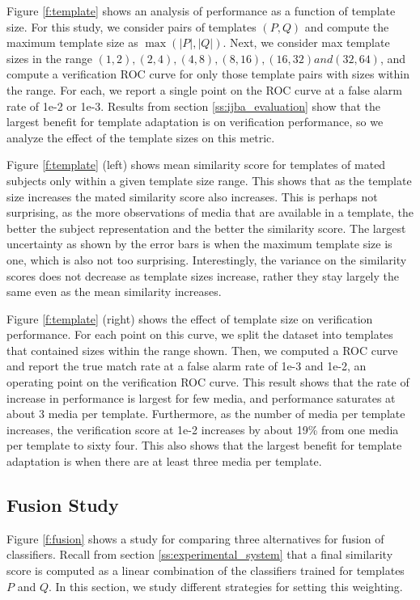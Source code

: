 \documentclass[10pt,twocolumn,letterpaper]{article}
\theoremstyle{definition}		\newtheorem{defn}[thm]{Definition}
\begin{document}
Figure \ref{f:template} shows an analysis of performance as a function of template size.  For this study, we consider pairs of templates $(P,Q)$ and compute the maximum template size as $\max(|P|,|Q|)$.   Next, we consider max template sizes in the range $(1,2), (2,4), (4,8), (8,16), (16,32) and (32,64)$, and compute a verification ROC curve for only those template pairs with sizes within the range. For each, we report a single point on the ROC curve at a false alarm rate of 1e-2 or 1e-3.  Results from section \ref{ss:ijba_evaluation} show that the largest benefit for template adaptation is on verification performance, so we analyze the effect of the template sizes on this metric.   

Figure \ref{f:template} (left) shows mean similarity score for templates of mated subjects only within a given template size range.  This shows that as the template size increases the mated similarity score also increases.  This is perhaps not surprising, as the more observations of media that are available in a template, the better the subject representation and the better the similarity score.  The largest uncertainty as shown by the error bars is when the maximum template size is one, which is also not too surprising.  Interestingly, the variance on the similarity scores does not decrease as template sizes increase, rather they stay largely the same even as the mean similarity increases.

Figure \ref{f:template} (right) shows the effect of template size on verification performance.  For each point on this curve, we split the dataset into templates that contained sizes within the range shown.  Then, we computed a ROC curve and report the true match rate at a false alarm rate of 1e-3 and 1e-2, an operating point on the verification ROC curve.  This result shows that the rate of increase in performance is largest for few media, and performance saturates at about 3 media per template.  Furthermore, as the number of media per template increases, the verification score at 1e-2 increases by about 19\% from one media per template to sixty four.  This also shows that the largest benefit for template adaptation is when there are at least three media per template.  


\subsection{Fusion Study}
\label{ss:fusion}




Figure \ref{f:fusion} shows a study for comparing three alternatives for fusion of classifiers.  Recall from section \ref{ss:experimental_system} that a final similarity score is computed as a linear combination of the classifiers trained for templates $P$ and $Q$.  In this section, we study different strategies for setting this weighting. 
\end{document}
